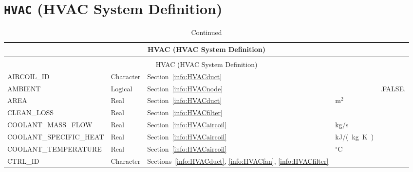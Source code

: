\documentclass[11pt]{book}
\begin{document}
\vspace{\baselineskip}


\section{\texorpdfstring{{\tt HVAC}}{HVAC} (HVAC System Definition)}


\begin{longtable}{@{\extracolsep{\fill}}|l|l|l|l|l|}
\caption[HVAC parameters ({\ct HVAC} namelist group)]{For more information see Section~\ref{info:HVAC}.}
\label{tbl:HVAC} \\
\hline
\multicolumn{5}{|c|}{{\ct HVAC} (HVAC System Definition)} \\
\hline \hline
\endfirsthead
\caption[]{Continued} \\
\hline
\multicolumn{5}{|c|}{{\ct HVAC} (HVAC System Definition)} \\
\hline \hline
\endhead
{\ct AIRCOIL\_ID}               & Character         & Section~\ref{info:HVACduct}                                                   &               &                \\ \hline
{\ct AMBIENT}                   & Logical           & Section~\ref{info:HVACnode}                                                   &               & {\ct .FALSE.}  \\ \hline
{\ct AREA}                      & Real              & Section~\ref{info:HVACduct}                                                   & m$^2$         &                \\ \hline
{\ct CLEAN\_LOSS}               & Real              & Section~\ref{info:HVACfilter}                                                 &               &                \\ \hline
{\ct COOLANT\_MASS\_FLOW}       & Real              & Section~\ref{info:HVACaircoil}                                                & kg/s          &                \\ \hline
{\ct COOLANT\_SPECIFIC\_HEAT}   & Real              & Section~\ref{info:HVACaircoil}                                                & \si{kJ/(kg.K)} &               \\ \hline
{\ct COOLANT\_TEMPERATURE}      & Real              & Section~\ref{info:HVACaircoil}                                                & $^\circ$C     &                \\ \hline
{\ct CTRL\_ID}                  & Character         & Sections~\ref{info:HVACduct}, \ref{info:HVACfan}, \ref{info:HVACfilter}       &               &                \\ \hline

\end{longtable}
\end{document}
